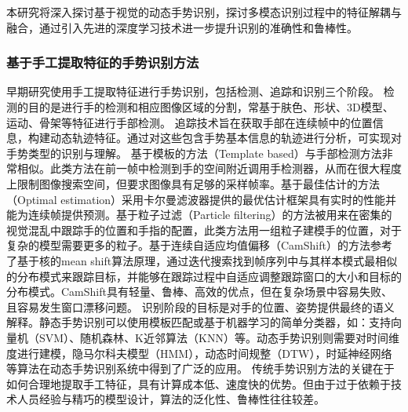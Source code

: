 本研究将深入探讨基于视觉的动态手势识别，探讨多模态识别过程中的特征解耦与融合，通过引入先进的深度学习技术进一步提升识别的准确性和鲁棒性。

\subsubsection{基于手工提取特征的手势识别方法}
早期研究使用手工提取特征进行手势识别，包括检测、追踪和识别三个阶段\cite{rautaray2015vision}。
检测的目的是进行手的检测和相应图像区域的分割，常基于肤色\cite{sigal2004skin}、形状\cite{chen2007real}、3D模型\cite{tekin2019h+}、运动\cite{pun2011real}、骨架\cite{jiang2021chal21}等特征进行手部检测。
追踪技术旨在获取手部在连续帧中的位置信息，构建动态轨迹特征。通过对这些包含手势基本信息的轨迹进行分析，可实现对手势类型的识别与理解。
基于模板的方法（Template based）\cite{crowley1995finger}与手部检测方法非常相似。此类方法在前一帧中检测到手的空间附近调用手检测器，从而在很大程度上限制图像搜索空间，但要求图像具有足够的采样帧率。基于最佳估计的方法（Optimal estimation）\cite{argyros2004real}采用卡尔曼滤波器\cite{kalman1960new}提供的最优估计框架具有实时的性能并能为连续帧提供预测。基于粒子过滤（Particle filtering）的方法\cite{perez2002color}被用来在密集的视觉混乱中跟踪手的位置和手指的配置，此类方法用一组粒子建模手的位置，对于复杂的模型需要更多的粒子。基于连续自适应均值偏移（CamShift）的方法\cite{wang2010study}参考了基于核的mean shift算法原理，通过迭代搜索找到帧序列中与其样本模式最相似的分布模式来跟踪目标，并能够在跟踪过程中自适应调整跟踪窗口的大小和目标的分布模式。CamShift具有轻量、鲁棒、高效的优点，但在复杂场景中容易失败、且容易发生窗口漂移问题。
识别阶段的目标是对手的位置、姿势提供最终的语义解释。静态手势识别可以使用模板匹配或基于机器学习的简单分类器\cite{基于视觉的动态手势识别研究综述}，如：支持向量机（SVM）\cite{burges1998tutorial}、随机森林\cite{基于视觉的动态手势识别研究综述}、K近邻算法（KNN）\cite{thirumuruganathan2010knn}等。动态手势识别则需要对时间维度进行建模，隐马尔科夫模型（HMM）\cite{liang1996sign}，动态时间规整（DTW）\cite{corradini2001dynamic}，时延神经网络\cite{sigal2004skin}等算法在动态手势识别系统中得到了广泛的应用。
传统手势识别方法的关键在于如何合理地提取手工特征，具有计算成本低、速度快的优势。但由于过于依赖于技术人员经验与精巧的模型设计，算法的泛化性、鲁棒性往往较差。

